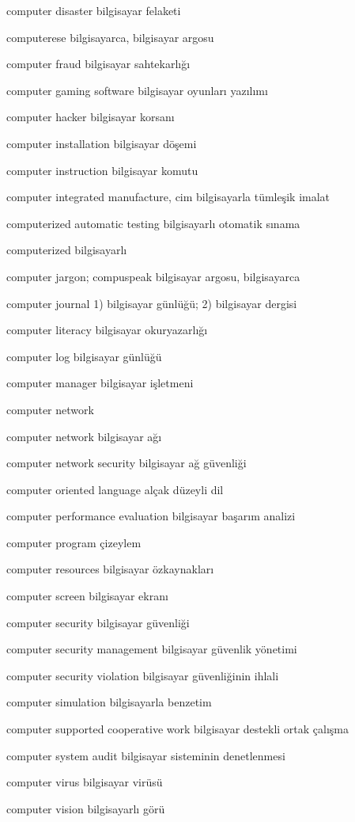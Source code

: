 \documentclass[12pt,fleqn]{article}\usepackage{../../common}
\begin{document}
computer disaster bilgisayar felaketi

computerese bilgisayarca, bilgisayar argosu

computer fraud bilgisayar sahtekarlığı

computer gaming software bilgisayar oyunları yazılımı

computer hacker bilgisayar korsanı

computer installation bilgisayar döşemi

computer instruction bilgisayar komutu

computer integrated manufacture, cim bilgisayarla tümleşik imalat

computerized automatic testing bilgisayarlı otomatik sınama

computerized bilgisayarlı

computer jargon; compuspeak bilgisayar argosu, bilgisayarca

computer journal 1) bilgisayar günlüğü; 2) bilgisayar dergisi

computer literacy bilgisayar okuryazarlığı

computer log bilgisayar günlüğü

computer manager bilgisayar işletmeni

computer network

computer network bilgisayar ağı

computer network security bilgisayar ağ güvenliği

computer oriented language alçak düzeyli dil

computer performance evaluation bilgisayar başarım analizi

computer program çizeylem

computer resources bilgisayar özkaynakları

computer screen bilgisayar ekranı

computer security bilgisayar güvenliği

computer security management bilgisayar güvenlik yönetimi

computer security violation bilgisayar güvenliğinin ihlali

computer simulation bilgisayarla benzetim

computer supported cooperative work bilgisayar destekli ortak çalışma

computer system audit bilgisayar sisteminin denetlenmesi

computer virus bilgisayar virüsü

computer vision bilgisayarlı görü
\end{document}
